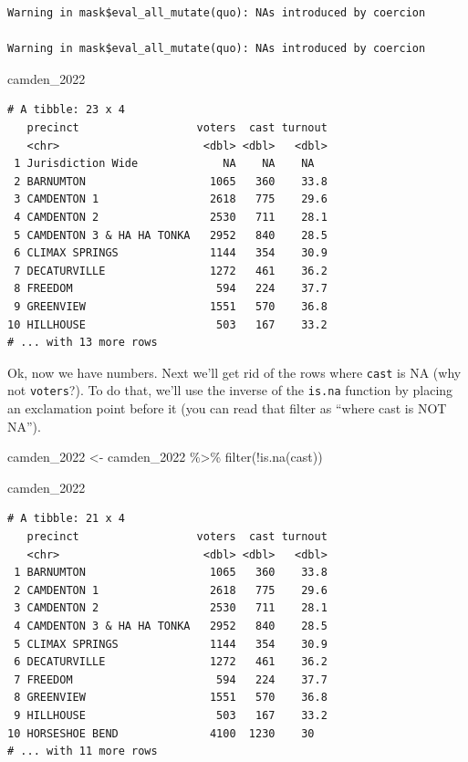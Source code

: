\documentclass[
  letterpaper,
  DIV=11,
  numbers=noendperiod]{scrreprt}
\newenvironment{Shaded}{\begin{snugshade}}{\end{snugshade}}
\newcommand{\FunctionTok}[1]{\textcolor[rgb]{0.28,0.35,0.67}{#1}}
\newcommand{\NormalTok}[1]{\textcolor[rgb]{0.00,0.23,0.31}{#1}}
\newcommand{\OtherTok}[1]{\textcolor[rgb]{0.00,0.23,0.31}{#1}}
\newcommand{\SpecialCharTok}[1]{\textcolor[rgb]{0.37,0.37,0.37}{#1}}
\begin{document}
\begin{verbatim}
Warning in mask$eval_all_mutate(quo): NAs introduced by coercion

Warning in mask$eval_all_mutate(quo): NAs introduced by coercion
\end{verbatim}

\begin{Shaded}
\begin{Highlighting}[]
\NormalTok{camden\_2022}
\end{Highlighting}
\end{Shaded}

\begin{verbatim}
# A tibble: 23 x 4
   precinct                  voters  cast turnout
   <chr>                      <dbl> <dbl>   <dbl>
 1 Jurisdiction Wide             NA    NA    NA  
 2 BARNUMTON                   1065   360    33.8
 3 CAMDENTON 1                 2618   775    29.6
 4 CAMDENTON 2                 2530   711    28.1
 5 CAMDENTON 3 & HA HA TONKA   2952   840    28.5
 6 CLIMAX SPRINGS              1144   354    30.9
 7 DECATURVILLE                1272   461    36.2
 8 FREEDOM                      594   224    37.7
 9 GREENVIEW                   1551   570    36.8
10 HILLHOUSE                    503   167    33.2
# ... with 13 more rows
\end{verbatim}

Ok, now we have numbers. Next we'll get rid of the rows where
\texttt{cast} is NA (why not \texttt{voters}?). To do that, we'll use
the inverse of the \texttt{is.na} function by placing an exclamation
point before it (you can read that filter as ``where cast is NOT NA'').

\begin{Shaded}
\begin{Highlighting}[]
\NormalTok{camden\_2022 }\OtherTok{\textless{}{-}}\NormalTok{ camden\_2022 }\SpecialCharTok{\%\textgreater{}\%} \FunctionTok{filter}\NormalTok{(}\SpecialCharTok{!}\FunctionTok{is.na}\NormalTok{(cast))}

\NormalTok{camden\_2022}
\end{Highlighting}
\end{Shaded}

\begin{verbatim}
# A tibble: 21 x 4
   precinct                  voters  cast turnout
   <chr>                      <dbl> <dbl>   <dbl>
 1 BARNUMTON                   1065   360    33.8
 2 CAMDENTON 1                 2618   775    29.6
 3 CAMDENTON 2                 2530   711    28.1
 4 CAMDENTON 3 & HA HA TONKA   2952   840    28.5
 5 CLIMAX SPRINGS              1144   354    30.9
 6 DECATURVILLE                1272   461    36.2
 7 FREEDOM                      594   224    37.7
 8 GREENVIEW                   1551   570    36.8
 9 HILLHOUSE                    503   167    33.2
10 HORSESHOE BEND              4100  1230    30  
# ... with 11 more rows
\end{verbatim}
\end{document}

